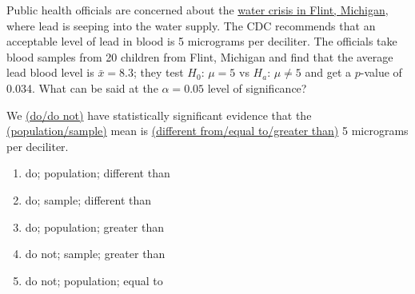 

\begin{frame}
\small{Public health officials are concerned about the \href{http://www.cnn.com/2016/01/05/health/flint-michigan-water-investigation/}{water crisis in Flint, Michigan}, where lead is seeping into the water supply.  The CDC recommends that an acceptable level of lead in blood is 5 micrograms per deciliter.  The officials take blood samples from 20 children from Flint, Michigan and find that the average lead blood level is $\bar{x}=8.3$; they test $H_0$: $\mu=5$ vs $H_a$: $\mu\neq5$ and get a $p$-value of 0.034.  What can be said at the $\alpha=0.05$ level of significance?}
\begin{clicker}{ We \underline{(do/do not)} have statistically significant evidence that the \underline{(population/sample)} mean is \underline{(different from/equal to/greater than)} 5 micrograms per deciliter.}
\begin{enumerate}
    \item
    do; population; different than
    \item
    do; sample; different than
    \item
    do; population; greater than
    \item
    do not; sample; greater than
    \item
    do not; population; equal to
\end{enumerate}
\end{clicker}
\end{frame}

